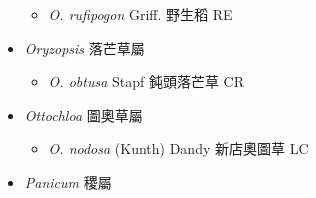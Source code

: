\begin{itemize}
  \begin{itemize}
        \item[] \textit{O. rufipogon} Griff.  野生稻   RE
  \end{itemize}
 \item[] \textit{Oryzopsis} 落芒草屬
                                
  \begin{itemize}
        \item[] \textit{O. obtusa} Stapf  鈍頭落芒草   CR
  \end{itemize}
 \item[] \textit{Ottochloa} 圖奧草屬
                                
  \begin{itemize}
        \item[] \textit{O. nodosa} (Kunth) Dandy  新店奧圖草   LC
  \end{itemize}
 \item[] \textit{Panicum} 稷屬
                                

\end{itemize}
